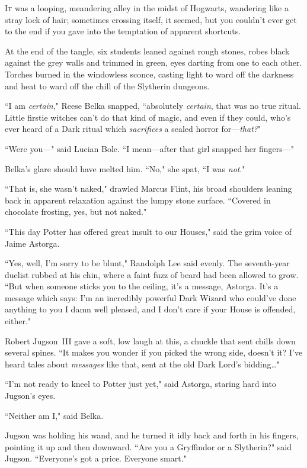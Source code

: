 
\lettrine{I}{t} was a looping, meandering alley in the midst of Hogwarts, wandering like a stray lock of hair; sometimes crossing itself, it seemed, but you couldn't ever get to the end if you gave into the temptation of apparent shortcuts.

At the end of the tangle, six students leaned against rough stones, robes black against the grey walls and trimmed in green, eyes darting from one to each other. Torches burned in the windowless sconce, casting light to ward off the darkness and heat to ward off the chill of the Slytherin dungeons.

``I am \emph{certain}," Reese Belka snapped, ``absolutely \emph{certain}, that was no true ritual. Little firstie witches can't do that kind of magic, and even if they could, who's ever heard of a Dark ritual which \emph{sacrifices} a sealed horror for—\emph{that?}"

``Were you—" said Lucian Bole. ``I mean—after that girl snapped her fingers—"

Belka's glare should have melted him. ``No," she spat, ``I was \emph{not}."

``That is, she wasn't naked," drawled Marcus Flint, his broad shoulders leaning back in apparent relaxation against the lumpy stone surface. ``Covered in chocolate frosting, yes, but not naked."

``This day Potter has offered great insult to our Houses," said the grim voice of Jaime Astorga.

``Yes, well, I'm sorry to be blunt," Randolph Lee said evenly. The seventh-year duelist rubbed at his chin, where a faint fuzz of beard had been allowed to grow. ``But when someone sticks you to the ceiling, it's a message, Astorga. It's a message which says: I'm an incredibly powerful Dark Wizard who could've done anything to you I damn well pleased, and I don't care if your House is offended, either."

Robert Jugson~III gave a soft, low laugh at this, a chuckle that sent chills down several spines. ``It makes you wonder if you picked the wrong side, doesn't it? I've heard tales about \emph{messages} like that, sent at the old Dark Lord's bidding{\ldots}"

``I'm not ready to kneel to Potter just yet," said Astorga, staring hard into Jugson's eyes.

``Neither am I," said Belka.

Jugson was holding his wand, and he turned it idly back and forth in his fingers, pointing it up and then downward. ``Are you a Gryffindor or a Slytherin?" said Jugson. ``Everyone's got a price. Everyone smart."

